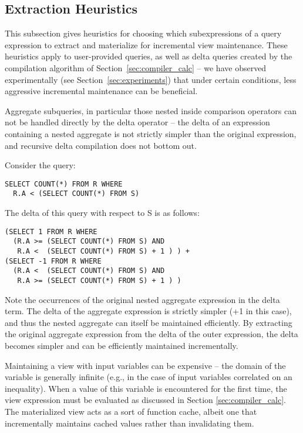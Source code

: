 \subsection{Extraction Heuristics}
\label{sec:advanced-rewriting}

This subsection gives heuristics for choosing which subexpressions of
a query expression to extract and materialize for incremental view maintenance.  These heuristics apply to user-provided queries, as well as delta queries created by the compilation algorithm of Section~\ref{sec:compiler_calc} -- we have observed experimentally (see Section~\ref{sec:experiments}) that under certain conditions, less aggressive incremental maintenance can be beneficial.

Aggregate subqueries, in particular those nested inside comparison operators can not be handled directly by the delta operator -- the delta of an expression containing a nested aggregate is not strictly simpler than the original expression, and recursive delta compilation does not bottom out.

\begin{example}
Consider the query:
\begin{verbatim}
SELECT COUNT(*) FROM R WHERE 
  R.A < (SELECT COUNT(*) FROM S)
\end{verbatim}
The delta of this query with respect to S is as follows:
\begin{verbatim}
(SELECT 1 FROM R WHERE 
  (R.A >= (SELECT COUNT(*) FROM S) AND
   R.A <  (SELECT COUNT(*) FROM S) + 1 ) ) + 
(SELECT -1 FROM R WHERE
  (R.A <  (SELECT COUNT(*) FROM S) AND
   R.A >= (SELECT COUNT(*) FROM S) + 1 ) )
\end{verbatim}
\end{example} 

Note the occurrences of the original nested aggregate expression in the delta term.  The delta of the aggregate expression is strictly simpler (+1 in this case), and thus the nested aggregate can itself be maintained efficiently.  By extracting the original aggregate expression from the delta of the outer expression, the delta becomes simpler and can be efficiently maintained incrementally.

Maintaining a view with input variables can be expensive -- the domain of the variable is generally infinite (e.g., in the case of input variables correlated on an inequality).  When a value of this variable is encountered for the first time, the view expression must be evaluated as discussed in Section \ref{sec:compiler_calc}.  The materialized view acts as a sort of function cache, albeit one that incrementally maintains cached values rather than invalidating them.

